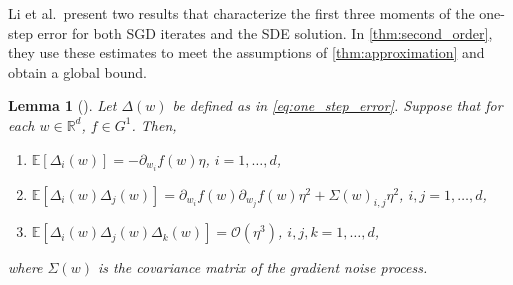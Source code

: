 \documentclass[12pt]{article}
\newtheorem{lemma}[lemma]{Lemma}
\theoremstyle{definition}
\numberwithin{equation}{section}
\newcommand{\R}{\mathbb{R}}
\newcommand{\CO}{\mathcal{O}}
\newcommand{\ev}[1]{\mathbb{E}\left[{#1}\right]}
\begin{document}
Li et al.\ present two results that characterize the first three moments of the one-step error for both SGD iterates and the SDE solution. In \autoref{thm:second_order}, they use these estimates to meet the assumptions of \autoref{thm:approximation} and obtain a global bound.
\begin{lemma}[]
  \label{lem:sgd_one_step}
  Let $\Delta(w)$ be defined as in \eqref{eq:one_step_error}. Suppose that for each $w \in \R^d$, $f \in G^1$. Then,
  \begin{enumerate}[label=(\roman*)]
    \item $\ev{\Delta_{i}(w)} = -\partial_{w_i} f(w) \eta$, $i = 1,\dots,d$,
    \item $\ev{\Delta_{i}(w)\Delta_{j}(w)} = \partial_{w_i} f(w)\partial_{w_j} f(w) \eta^2 + \Sigma(w)_{i,j}\eta^2$, $i,j = 1,\dots,d$,
    \item $\ev{\Delta_{i}(w)\Delta_{j}(w)\Delta_{k}(w)} = \CO(\eta^3)$, $i,j,k=1,\dots,d$,
  \end{enumerate}
  where $\Sigma(w)$ is the covariance matrix of the gradient noise process.
\end{lemma}
\end{document}
